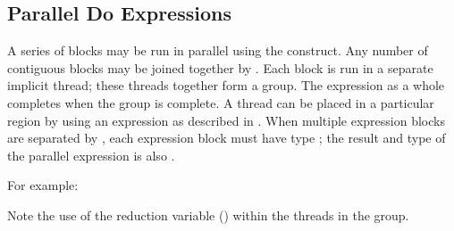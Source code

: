 %
%
%
%

\subsection{Parallel Do Expressions}


A series of blocks may be run in parallel using the 
construct.  Any number of contiguous blocks may be joined together by
.  Each block is run in a separate
implicit thread; these threads together form a group.  The expression
as a whole completes when the group is complete.
A thread can be placed in a particular region by using an  expression
as described in .
When multiple
expression blocks are separated by , each expression block must
have type \EXP{()}; the result and type of the parallel 
expression is also \EXP{()}.


For example:

Note the use of the reduction variable 
() within the threads in the group.
